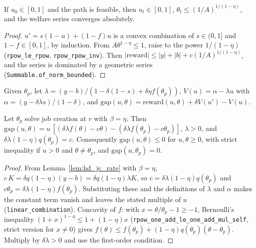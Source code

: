 \begin{lemma}
\label{lem:hd_feasible}
\leanok
{}
If $u_0 \in [0,1]$ and the path is feasible, then $u_t \in [0,1]$, $\theta_t \le (1/A)^{1/(1-\eta)}$, and the
welfare series converges absolutely.
\end{lemma}
\begin{proof}
\leanok
$u' = s(1-u) + (1-f)u$ is a convex combination of $s \in (0,1]$ and $1 - f \in [0,1]$, by induction. From
$A\theta^{1-\eta} \le 1$, raise to the power $1/(1-\eta)$ (\texttt{rpow\_le\_rpow}, \texttt{rpow\_rpow\_inv}).
Then $|\mathrm{reward}| \le |y| + |b| + c(1/A)^{1/(1-\eta)}$, and the series is dominated by a geometric series
(\texttt{Summable.of\_norm\_bounded}).
\end{proof}

\begin{definition}
\label{def:hd_value}
\leanok
{}
Given $\theta_p$, let $\lambda = (y-b)/(1 - \delta(1-s) + \delta\eta f(\theta_p))$, $V(u) = \alpha - \lambda u$ with
$\alpha = (y - \delta\lambda s)/(1-\delta)$, and $\mathrm{gap}(u, \theta) = \mathrm{reward}(u,\theta) + \delta V(u') - V(u)$.
\end{definition}

\begin{lemma}
\label{lem:hd_gap}
\leanok
{}
Let $\theta_p$ solve job creation at $r$ with $\beta = \eta$. Then
$\mathrm{gap}(u,\theta) = u\,[(\delta\lambda f(\theta) - c\theta) - (\delta\lambda f(\theta_p) - c\theta_p)]$, $\lambda > 0$,
and $\delta\lambda(1-\eta)q(\theta_p) = c$. Consequently $\mathrm{gap}(u, \theta) \le 0$ for $u, \theta \ge 0$, with strict
inequality if $u > 0$ and $\theta \ne \theta_p$, and $\mathrm{gap}(u, \theta_p) = 0$.
\end{lemma}
\begin{proof}
\leanok
From Lemma~\ref{lem:hd_jc_rate} with $\beta = \eta$, $c\,K = \delta q(1-\eta)(y-b) = \delta q (1-\eta)\lambda K$, so
$c = \delta\lambda(1-\eta)q(\theta_p)$ and $c\theta_p = \delta\lambda(1-\eta)f(\theta_p)$. Substituting these and the
definitions of $\lambda$ and $\alpha$ makes the constant term vanish and leaves the stated multiple of $u$
(\texttt{linear\_combination}). Concavity of $f$: with $x = \theta/\theta_p - 1 \ge -1$,
Bernoulli's inequality $(1+x)^{1-\eta} \le 1 + (1-\eta)x$ (\texttt{rpow\_one\_add\_le\_one\_add\_mul\_self},
strict version for $x \ne 0$) gives $f(\theta) \le f(\theta_p) + (1-\eta)q(\theta_p)(\theta - \theta_p)$. Multiply by
$\delta\lambda > 0$ and use the first-order condition.
\end{proof}

